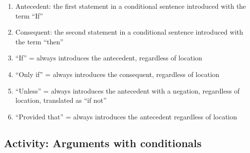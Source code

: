 \documentclass[
]{book}
\providecommand{\tightlist}{%
  \setlength{\itemsep}{0pt}\setlength{\parskip}{0pt}}
\begin{document}
\begin{enumerate}
\def\labelenumi{\arabic{enumi}.}
\tightlist
\item
  Antecedent: the first statement in a conditional sentence introduced with the term ``If''\\
\item
  Consequent: the second statement in a conditional sentence introduced with the term ``then''\\
\item
  ``If'' = always introduces the antecedent, regardless of location\\
\item
  ``Only if'' = always introduces the consequent, regardless of location\\
\item
  ``Unless'' = always introduces the antecedent with a negation, regardless of location, translated as ``if not''\\
\item
  ``Provided that'' = always introduces the antecedent regardless of location
\end{enumerate}

\hypertarget{activity-arguments-with-conditionals}{%
\subsection*{Activity: Arguments with conditionals}\label{activity-arguments-with-conditionals}}
\end{document}

